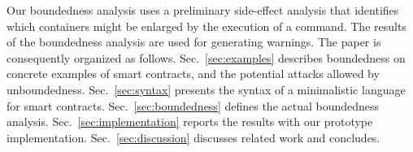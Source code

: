 Our boundedness analysis uses a preliminary side-effect analysis that
identifies which containers
might be enlarged by the execution of a command.
The results of the boundedness analysis are
used for generating warnings.
The paper is consequently organized as follows.
Sec.~\ref{sec:examples} describes boundedness on
concrete examples of smart contracts, and the potential attacks allowed by unboundedness.
Sec.~\ref{sec:syntax} presents the syntax of a minimalistic language for smart contracts.
Sec.~\ref{sec:boundedness} defines the actual boundedness analysis.
Sec.~\ref{sec:implementation} reports the results
with our prototype implementation.
Sec.~\ref{sec:discussion} discusses related work and concludes.

